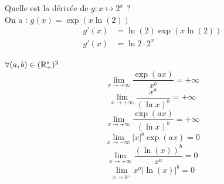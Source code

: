 \begin{exemple}
	Quelle est la dérivée de $g : x \mapsto 2^x$ ? \\
	On a : $g(x) = \exp{(x \ln{(2)})}$
	\begin{align*}
		g'(x) &= \ln{(2)} \exp{(x\ln{(2)})} \\
		g'(x) &= \ln{2} \cdot 2^x
	\end{align*}
\end{exemple}

\begin{graybox}
	\begin{theoreme}
		$\forall (a, b) \in (\mathbb{R}^*_+)^2$
		\[\lim_{x \to +\infty} \frac{\exp{(ax)}}{x^b} = + \infty \]
		\[\lim_{x \to +\infty} \frac{x^a}{(\ln{x})^b} = +\infty\] 
		\[\lim_{x \to +\infty} \frac{\exp{(ax)}}{(\ln{x})^b} = +\infty\]
		\[ \lim_{x \to -\infty} |x|^b \exp{(ax)} = 0 \]
		\[ \lim_{x \to +\infty} \frac{(\ln{(x)})^b}{x^a} = 0 \]
		\[ \lim_{x \to 0^{+}} x^a |\ln{(x)}|^b = 0 \]
	\end{theoreme}
\end{graybox}
